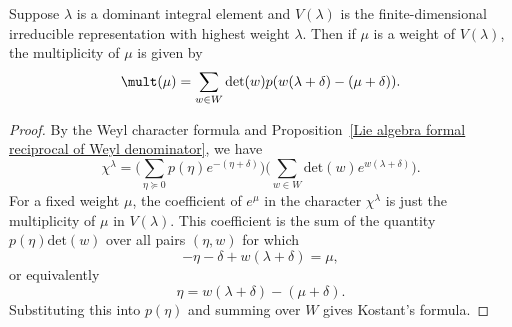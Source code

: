 \begin{theorem}
Suppose $\lambda$ is a dominant integral element and $V(\lambda)$ is the finite-dimensional irreducible representation with highest weight $\lambda$. Then if $\mu$ is a weight of $V(\lambda)$, the multiplicity of $\mu$ is given by
\[\mult(\mu)=\sum_{w\in W}\mathrm{det}(w) p(w(\lambda+\delta)-(\mu+\delta)).\]
\end{theorem}
\begin{proof}
By the Weyl character formula and Proposition~\ref{Lie algebra formal reciprocal of Weyl denominator}, we have
\[\chi^\lambda=\Big(\sum_{\eta\succeq 0}p(\eta)e^{-(\eta+\delta)}\Big)\Big(\sum_{w\in W}\mathrm{det}(w)e^{w(\lambda+\delta)}\Big).\]
For a fixed weight $\mu$, the coefficient of $e^{\mu}$ in the character $\chi^\lambda$ is just the multiplicity of $\mu$ in $V(\lambda)$. This coefficient is the sum of the quantity $p(\eta)\mathrm{det}(w)$ over all pairs $(\eta,w)$ for which
\[-\eta-\delta+w(\lambda+\delta)=\mu,\]
or equivalently
\[\eta=w(\lambda+\delta)-(\mu+\delta).\]
Substituting this into $p(\eta)$ and summing over $W$ gives Kostant's formula.
\end{proof}
